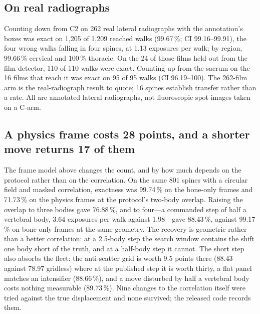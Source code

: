 \documentclass[11pt,letterpaper]{article}
\begin{document}
\subsection*{On real radiographs}
Counting down from C2 on 262 real lateral radiographs with the annotation's boxes was exact on 1{,}205 of
1{,}209 reached walks (99.67\,\%; CI 99.16--99.91), the four wrong walks falling in four spines, at 1.13
exposures per walk; by region, 99.66\,\% cervical and 100\,\% thoracic. On the 24 of those films held out
from the film detector, 110 of 110 walks were exact. Counting up from the sacrum on the 16 films that reach
it was exact on 95 of 95 walks (CI 96.19--100). The 262-film arm is the real-radiograph result to quote;
16 spines establish transfer rather than a rate. All are annotated lateral radiographs, not fluoroscopic
spot images taken on a C-arm.

\subsection*{A physics frame costs 28 points, and a shorter move returns 17 of them}
The frame model above changes the count, and by how much depends on the protocol rather than on the
correlation. On the same 801 spines with a circular field and masked correlation, exactness was
99.74\,\% on the bone-only frames and 71.73\,\% on the physics frames at the protocol's two-body overlap.
Raising the overlap to three bodies gave 76.88\,\%, and to four---a commanded step of half a vertebral
body, 3.64 exposures per walk against 1.98---gave 88.43\,\%, against 99.17\,\% on bone-only frames at the
same geometry. The recovery is geometric rather than a better correlation: at a 2.5-body step the search
window contains the shift one body short of the truth, and at a half-body step it cannot. The short step
also absorbs the fleet: the anti-scatter grid is worth 9.5 points there (88.43 against 78.97 gridless)
where at the published step it is worth thirty, a flat panel matches an intensifier (88.66\,\%), and a
move disturbed by half a vertebral body costs nothing measurable (89.73\,\%). Nine changes to the
correlation itself were tried against the true displacement and none survived; the released code records
them.
\end{document}
